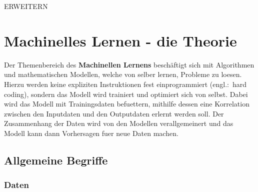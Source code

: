 \documentclass[../main]{subfiles}
\begin{document}
ERWEITERN


\pagebreak
\section{Machinelles Lernen - die Theorie}

Der Themenbereich des \textbf{Machinellen Lernens} beschäftigt sich mit Algorithmen und mathematischen Modellen, welche von selber lernen, Probleme zu loesen.
Hierzu werden keine expliziten Instruktionen fest einprogrammiert (engl.:\ hard coding), sondern das Modell wird trainiert und optimiert sich von selbst.
Dabei wird das Modell mit Trainingsdaten befuettern, mithilfe dessen eine Korrelation zwischen den Inputdaten und den Outputdaten erlernt werden soll.
Der Zusammenhang der Daten wird von den Modellen verallgemeinert und das Modell kann dann Vorhersagen fuer neue Daten machen.

\subsection{Allgemeine Begriffe}

\subsubsection{Daten}
\end{document}

